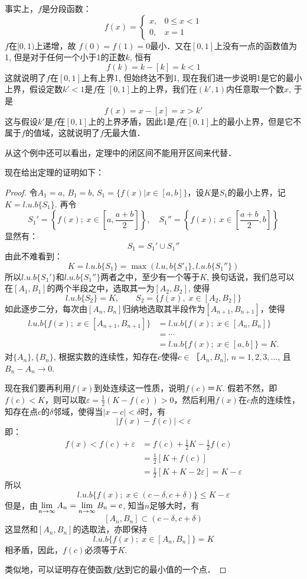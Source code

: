 事实上，$f$是分段函数：
\[f(x)=\begin{cases}
    x,& 0\le x<1\\
    0,& x=1
\end{cases}\]
$f$在$[0, 1)$上递增，故
$f(0)=f(1)=0$最小．又在$[0, 1]$上没有一点的函数值为1, 但是对于任何一个小于1的正数$k$, 恒有
\[f (k) =k- [k] =k<1\]
这就说明了$f$在$[0, 1]$上有上界1, 但始终达不到1, 现在我们进一步说明1是它的最小上界，假设定数$k'<1$是$f$在
$[0, 1]$上的上界，我们在$(k',1)$内任意取一个数$x$, 于是
\[f (x) =x- [x] =x> k'\]
这与假设$k'$是$f$在$[0, 1]$上的上界矛盾，因此1是$f$在$[0, 1]$上的最小上界，但是它不属于$f$的值域，这就说明了$f$无最大值．

从这个例中还可以看出，定理中的闭区间不能用开区间来代替．

现在给出定理的证明如下：

\begin{proof}
令$A_1=a$, $B_1=b$, $S_1=\{f(x)|x\in [a,b]\}$，设$K$是$S_1$的最小上界，记$K=l.u.b\{S_1\}$. 再令
\[S_1'=\left\{f (x) ; \; x\in \left[a,\frac{a+b}{2}\right]\right\},\quad S_1''=\left\{f(x);\; x\in\left[\frac{a+b}{2},b\right]\right\}\]
显然有：
\[S_1=S_1'\cup S_1''\]
由此不难看到：
\[K=l.u.b \{S_1\} =\max \left(l.u,b \{S'_1\} ,l.u.b\{S_1''\}\right)\]
所以$l.u.b\{S_1'\}$和$l.u.b\{S_1''\}$两者之中，至少有一个等于$K$, 换句话说，我们总可以在$[A_1,B_1]$的两个半段之中，选取其一为$[A_2,B_2]$, 使得
\[l.u.b \{S_2\} =K,\qquad  S_2= \{f (x) ,\; x\in [A_2, B_2] \}\] 
如此逐步二分，每次由$[A_{n} ,B_{n}]$归纳地选取其半段作为$[A_{n+1} ,B_{n+1}]$，使得
\[\begin{split}
    l.u.b \{f (x) ;\; x\in  [A_{n+1}, B_{n+1}] \}&=l.u.b \{f (x) ;\; x\in [A_n, B_n] \}\\
&=\cdots\\
&=l.u.b \{f (x) ;\; x\in  [a,b] \}=K.
\end{split}\]
对$\{A_n\},\{B_n \}$, 根据实数的连续性，知存在$c$使得$c\in ［A_n,B_n]$, $n=1, 2, 3,\ldots$, 且$B_n-A_n\to 0$.

现在我们要再利用$f(x)$到处连续这一性质，说明$f(c)＝K$. 假若不然，即$f(c)<K$，则可以取$\varepsilon=\frac{1}{2}(K-f(c))>0$，然后利用$f(x)$在$c$点的连续性，知存在点$c$的$\delta$邻域，使得当$|x-c|<\delta$时，有
\[|f(x)-f(c)|<\varepsilon\]
即：
\[\begin{split}
    f(x)<f(c)+\varepsilon&=f(c)+\frac{1}{2}K-\frac{1}{2}f(c)\\
    &=\frac{1}{2}[K+f(c)]\\
    &=\frac{1}{2}[K+K-2\varepsilon]=K-\varepsilon
\end{split}\]
所以
\[l.u.b \{f (x) ;\; x\in  (c-\delta,c+\delta) \} \le K-\varepsilon\]
但是，由$\displaystyle\lim_{n\to\infty} A_n=\displaystyle\lim_{n\to\infty}B_n=c$, 知当$n$足够大时，有
\[[A_n,B_n]\subset (c-\delta,c+\delta)\]
这显然和$[A_n,B_n]$的选取法，亦即保持
\[l.u.b \{f (x) ;\; x\in [A_n,B_n]\}=K\]
相矛盾，因此，$f(c)$必须等于$K$. 

类似地，可以证明存在使函数$f$达到它的最小值的一个点．
\end{proof}


